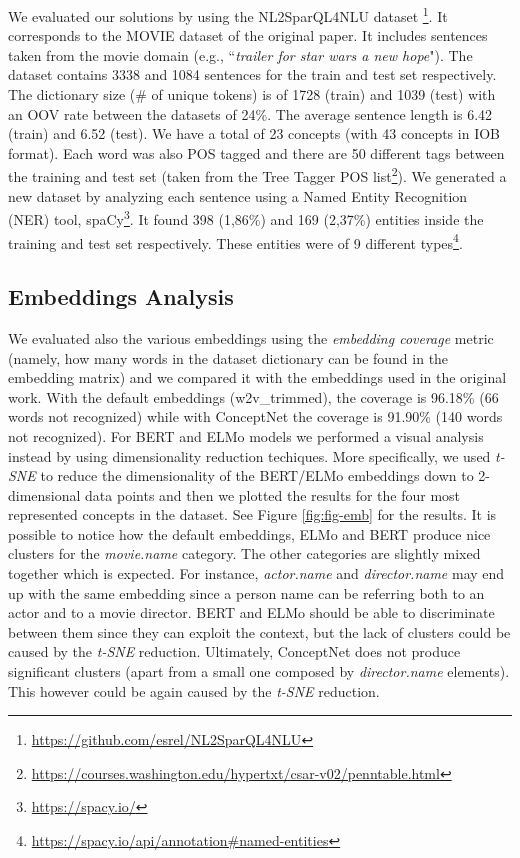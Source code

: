 \documentclass[11pt,a4paper]{article}
\begin{document}
We evaluated our solutions by using the NL2SparQL4NLU dataset \footnote{\url{https://github.com/esrel/NL2SparQL4NLU}}. It corresponds to the MOVIE dataset of the original paper. It includes sentences taken from the movie domain (e.g., ``\textit{trailer for star wars a new hope}"). The dataset contains 3338 and 1084 sentences for the train and test set respectively. The dictionary size (\# of unique tokens) is of 1728 (train) and 1039 (test) with an OOV rate between the datasets of 24\%. The average sentence length is 6.42 (train) and 6.52 (test). We have a total of 23 concepts (with 43 concepts in IOB format). Each word was also POS tagged and there are 50 different tags between the training and test set (taken from the Tree Tagger POS list\footnote{\url{https://courses.washington.edu/hypertxt/csar-v02/penntable.html}}).
We generated a new dataset by analyzing each sentence using a Named Entity Recognition (NER) tool, spaCy\footnote{\url{https://spacy.io/}}. It found 398 (1,86\%)  and 169 (2,37\%) entities inside the training and test set respectively. These entities were of 9 different types\footnote{\url{https://spacy.io/api/annotation\#named-entities}}.

\subsection{Embeddings Analysis}
We evaluated also the various embeddings using the \textit{embedding coverage} metric (namely, how many words in the dataset dictionary can be found in the embedding matrix) and we compared it with the embeddings used in the original work. With the default embeddings (w2v\_trimmed), the coverage is 96.18\% (66 words not recognized) while with ConceptNet the coverage is 91.90\% (140 words not recognized). For BERT and ELMo models we performed a visual analysis instead by using dimensionality reduction techiques. More specifically, we used \textit{t-SNE} \cite{Maaten2008VisualizingDU} to reduce the dimensionality of the BERT/ELMo embeddings down to 2-dimensional data points and then we plotted the results for the four most represented concepts in the dataset. See Figure \ref{fig:fig-emb} for the results. It is possible to notice how the default embeddings, ELMo and BERT produce nice clusters for the \textit{movie.name} category. The other categories are slightly mixed together which is expected. For instance, \textit{actor.name} and \textit{director.name} may end up with the same embedding since a person name can be referring both to an actor and to a movie director.
BERT and ELMo should be able to discriminate between them since they can exploit the context, but the lack of clusters could be caused by the \textit{t-SNE} reduction.
Ultimately, ConceptNet does not produce significant clusters (apart from a small one composed by \textit{director.name} elements). This however could be again caused by the \textit{t-SNE} reduction.
\end{document}
